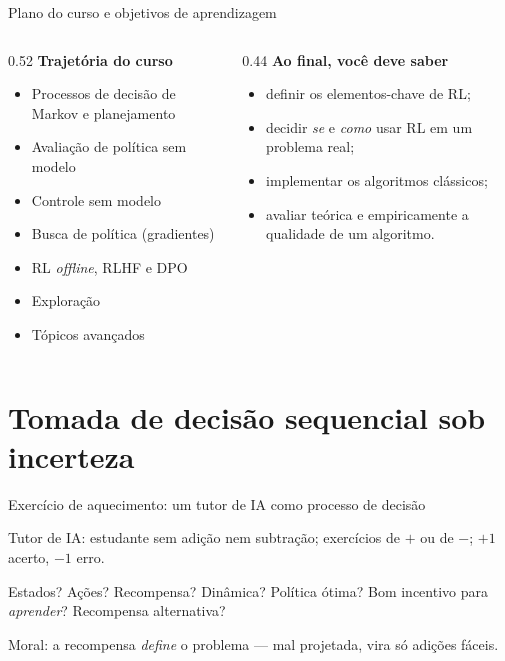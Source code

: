 \documentclass[aspectratio=169, 11pt]{beamer}
\begin{document}
\begin{frame}{Plano do curso e objetivos de aprendizagem}
  \begin{columns}[T]
    \begin{column}{0.52\textwidth}
      \textbf{Trajetória do curso}
      \begin{itemize}\setlength{\itemsep}{0.2ex}
        \item Processos de decisão de Markov e planejamento
        \item Avaliação de política sem modelo
        \item Controle sem modelo
        \item Busca de política (gradientes)
        \item RL \emph{offline}, RLHF e DPO
        \item Exploração
        \item Tópicos avançados
      \end{itemize}
    \end{column}
    \begin{column}{0.44\textwidth}
      \textbf{Ao final, você deve saber}
      \begin{itemize}\setlength{\itemsep}{0.2ex}
        \item definir os elementos-chave de RL;
        \item decidir \emph{se} e \emph{como} usar RL em um problema real;
        \item implementar os algoritmos clássicos;
        \item avaliar teórica e empiricamente a qualidade de um algoritmo.
      \end{itemize}
    \end{column}
  \end{columns}
\end{frame}

\section{Tomada de decisão sequencial sob incerteza}

\begin{frame}{Exercício de aquecimento: um tutor de IA como processo de decisão}
  \begin{quizbox}{}
    Tutor de IA: estudante sem adição nem subtração; exercícios de $+$ ou de $-$; $+1$ acerto, $-1$ erro.

    \smallskip
    Estados? Ações? Recompensa? Dinâmica? Política ótima? Bom incentivo para \emph{aprender}? Recompensa alternativa?
  \end{quizbox}

  \begin{alertabox}
    Moral: a recompensa \emph{define} o problema — mal projetada, vira só adições fáceis.
  \end{alertabox}
\end{frame}
\end{document}
